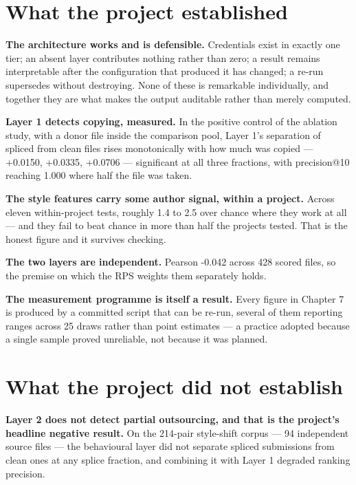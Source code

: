 \hypertarget{what-the-project-established}{%
\section{What the project
established}\label{what-the-project-established}}

\textbf{The architecture works and is defensible.} Credentials exist in
exactly one tier; an absent layer contributes nothing rather than zero;
a result remains interpretable after the configuration that produced it
has changed; a re-run supersedes without destroying. None of these is
remarkable individually, and together they are what makes the output
auditable rather than merely computed.

\textbf{Layer 1 detects copying, measured.} In the positive control of
the ablation study, with a donor file inside the comparison pool, Layer
1's separation of spliced from clean files rises monotonically with how
much was copied --- +0.0150, +0.0335, +0.0706 --- significant at all
three fractions, with precision@10 reaching 1.000 where half the file
was taken.

\textbf{The style features carry some author signal, within a project.}
Across eleven within-project tests, roughly 1.4\texttimes{} to 2.5\texttimes{} over chance
where they work at all --- and they fail to beat chance in more than
half the projects tested. That is the honest figure and it survives
checking.

\textbf{The two layers are independent.} Pearson -0.042 across 428
scored files, so the premise on which the RPS weights them separately
holds.

\textbf{The measurement programme is itself a result.} Every figure in
Chapter 7 is produced by a committed script that can be re-run, several
of them reporting ranges across 25 draws rather than point estimates ---
a practice adopted because a single sample proved unreliable, not
because it was planned.

\hypertarget{what-the-project-did-not-establish}{%
\section{What the project did not
establish}\label{what-the-project-did-not-establish}}

\textbf{Layer 2 does not detect partial outsourcing, and that is the
project's headline negative result.} On the 214-pair style-shift corpus
--- 94 independent source files --- the behavioural layer did not
separate spliced submissions from clean ones at any splice fraction, and
combining it with Layer 1 degraded ranking precision.

